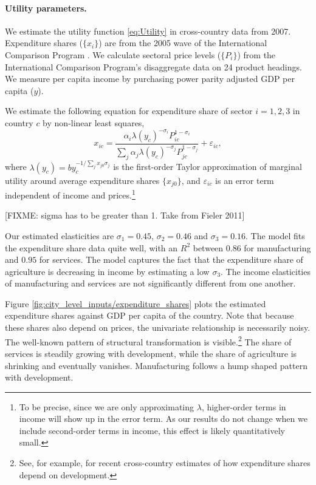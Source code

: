 \documentclass[12pt]{article}
\begin{document}
\paragraph{Utility parameters.}
We estimate the utility function \eqref{eq:Utility} in cross-country data from 2007. Expenditure shares ($\{x_i\}$) are from the 2005 wave of the International Comparison Program \cite{icp}. We calculate sectoral price levels ($\{P_i\}$) from the International Comparison Program's disaggregate data on 24 product headings. We measure per capita income by purchasing power parity adjusted GDP per capita ($y$).

We estimate the following equation for expenditure share of sector $i=1,2,3$ in country $c$ by non-linear least squares,
\begin{equation}\label{eq:estimable:utility}
	x_{ic} =
	\frac 	{\alpha_i \lambda(y_c)^{-\sigma_i}  P_{ic}^{1-\sigma_i}}
			{\sum_j {\alpha_j \lambda(y_c)^{-\sigma_j}  P_{jc}^{1-\sigma_j}}}
	+ \varepsilon_{ic},
\end{equation}
where $\lambda(y_c) = by_c^{-1/\sum_j x_{j0}\sigma_j}$ is the first-order Taylor approximation of marginal utility around average expenditure shares $\{x_{j0}\}$, and $\varepsilon_{ic}$ is an error term independent of income and prices.\footnote{To be precise, since we are only approximating $\lambda$, higher-order terms in income will show up in the error term. As our results do not change when we include second-order terms in income, this effect is likely quantitatively small.}

[FIXME: sigma has to be greater than 1. Take from Fieler 2011]

Our estimated elasticities are $\sigma_1=0.45$, $\sigma_2=0.46$ and $\sigma_3=0.16$. The model fits the expenditure share data quite well, with an $R^2$ between $0.86$ for manufacturing and $0.95$ for services. The model captures the fact that the expenditure share of agriculture is decreasing in income by estimating a low $\sigma_3$. The income elasticities of manufacturing and services are not significantly different from one another.

Figure \ref{fig:city_level_inputs/expenditure_shares} plots the estimated expenditure shares against GDP per capita of the country. Note that because these shares also depend on prices, the univariate relationship is necessarily noisy. The well-known pattern of structural transformation is visible.\footnote{See, for example,  for recent cross-country estimates of how expenditure shares depend on development.} The share of services is steadily growing with development, while the share of agriculture is shrinking and eventually vanishes. Manufacturing follows a hump shaped pattern with development.
\end{document}
